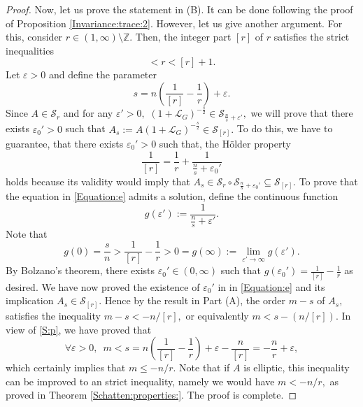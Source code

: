 \documentclass[12pt, reqno]{amsart}
\theoremstyle{definition}
\theoremstyle{remark}
\numberwithin{equation}{section}
\begin{document}
\begin{proof}
Now, let us prove the statement in (B). It can be done following  the proof of Proposition \ref{Invariance:trace:2}. However, let us give another argument. For this, consider $r\in (1,\infty)\setminus \mathbb{Z}.
$ Then, the integer part $[r]$ of $r$ satisfies the strict inequalities
\begin{equation}
    [r]<r<[r]+1.
\end{equation} Let $\varepsilon>0$ and define the parameter
\begin{equation}\label{S:p}
    s=n\left(\frac{1}{[r]}-\frac{1}{r}\right)+\varepsilon.
\end{equation}Since $A\in \mathscr{S}_r
$ and  for any $\varepsilon'>0,$ $(1+\mathcal{L}_G)^{-\frac{s}{2}}\in \mathscr{S}_{\frac{n}{s}+\varepsilon'},$ we will prove that there exists $\varepsilon_0'>0$ such that $A_{s}:=A(1+\mathcal{L}_G)^{-\frac{s}{2}}\in \mathscr{S}_{[r]}.$ To do this, we have to guarantee, that there exists $\varepsilon_0'>0$ such that, the H\"older property 
\begin{equation}\label{Equation:e}
    \frac{1}{[r]}=\frac{1}{r}+\frac{1}{\frac{n}{s}+\varepsilon_0'}
\end{equation}holds because its validity would imply that $A_{s}\in \mathscr{S}_{r}\circ \mathscr{S}_{\frac{n}{s}+\varepsilon_0'}\subseteq \mathscr{S}_{[r]}. $ To prove that the equation in \eqref{Equation:e} admits a solution, define the continuous function 
\begin{equation}
    g(\varepsilon'):=\frac{1}{\frac{n}{s}+\varepsilon'}.
\end{equation} Note that 
\begin{equation}
    g(0)=\frac{s}{n}>\frac{1}{[r]}-\frac{1}{r}>0=g(\infty):=\lim_{\varepsilon'\rightarrow \infty}g(\varepsilon').
\end{equation}By Bolzano's theorem, there exists $\varepsilon_0'\in (0,\infty)$ such that $g(\varepsilon_0')= \frac{1}{[r]}-\frac{1}{r}$ as desired. We have now proved the existence of $\varepsilon_0'$ in in \eqref{Equation:e} and its implication $A_{s}\in \mathscr{S}_{[r]}.$ Hence by the result in Part (A), the order $m-s$ of $A_s,$ satisfies the inequality $m-s<-{n}/{[r]},$ or equivalently $m<s-({n}/{[r]}).$ In view of \eqref{S:p}, we have proved that
\begin{equation}
    \forall \varepsilon>0,\,\,\, m<
    s=n\left(\frac{1}{[r]}-\frac{1}{r}\right)+\varepsilon-\frac{n}{[r]}=-\frac{n}{r}+\varepsilon,
\end{equation}which certainly implies that $m\leq -n/r.$ Note that if $A$ is elliptic, this inequality can be improved to an strict inequality, namely we would have $m<-n/r,$ as proved in Theorem \ref{Schatten:properties:}. The proof is complete.   
\end{proof}
\end{document}
